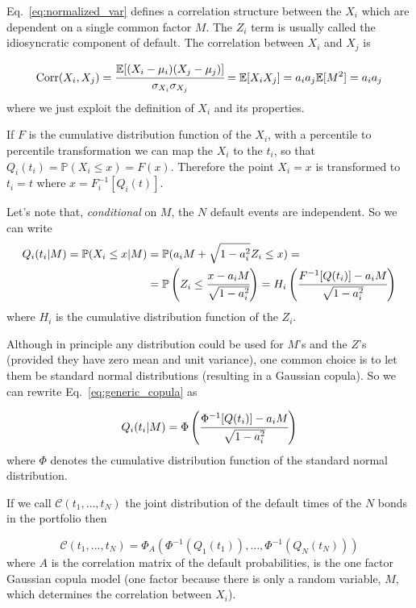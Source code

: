 Eq.~\ref{eq:normalized_var} defines a correlation structure between the
\(X_i\) which are dependent on a single common factor \(M\). The $Z_i$ term is usually 
called the idiosyncratic component of default. 
The correlation between \(X_i\) and \(X_j\) is

\[
\mathrm{Corr}(X_i, X_j) = \cfrac{\mathbb{E}[(X_i-\mu_i)(X_j-\mu_j)]}{\sigma_{X_i}\sigma_{X_j}} =\mathbb{E}[X_i X_j] = a_i a_j \mathbb{E}[M^2] = a_i a_j
\]
where we just exploit the definition of $X_i$ and its properties.

If $F$ is the cumulative distribution function of the $X_i$,
with a percentile to percentile transformation we can map the \(X_i\) to the \(t_i\), so that $Q_i(t_i) = \mathbb{P}(X_i\le x)=F(x)$.
Therefore the point \(X_i = x\) is transformed to \(t_i = t\) where
\(x = F_i^{-1}[Q_i(t)]\).

Let's note that, \emph{conditional} on $M$, the $N$ default events are independent. So we can write
\begin{equation}
\begin{split}
Q_i(t_i|M) = \mathbb{P}(X_i\le x|M) &= \mathbb{P}(a_i M + \sqrt{1-a_i^2}Z_i\le x) =\\
&= \mathbb{P}\left(Z_i\le \cfrac{x-a_i M}{\sqrt{1-a_i^2}}\right)
=H_i\left(\cfrac{F^{-1}[Q(t_i)]-a_i M}{\sqrt{1-a_i^2}}\right)
\end{split}
\label{eq:generic_copula}
\end{equation}
where $H_i$ is the cumulative distribution function of the $Z_i$.

Although in principle any distribution could be used for \(M\)'s and the
\(Z\)'s (provided they have zero mean and unit variance), one common
choice is to let them be standard normal distributions (resulting in a
Gaussian copula).
So we can rewrite Eq.~\ref{eq:generic_copula} as

\begin{equation}
Q_i(t_i|M) = \Phi\left(\cfrac{\Phi^{-1}[Q(t_i)]-a_i M}{\sqrt{1-a_i^2}}\right)
\label{eq:gaussian_one_factor_copula}
\end{equation}
where $\Phi$ denotes the cumulative distribution function of the standard normal distribution.

If we call $\mathcal{C}(t_1,\ldots,t_N)$ the joint distribution of the default times of the $N$ bonds  in the portfolio then

\[
\mathcal{C}(t_1,\ldots,t_N)=\Phi_{A}(\Phi^{-1}(Q_1(t_1)),\ldots,\Phi^{-1}(Q_N(t_N)))
\]
where $A$ is the correlation matrix of the default probabilities, is the one factor Gaussian copula model (one factor because there is only a random variable, $M$, which determines the correlation between $X_i$).


